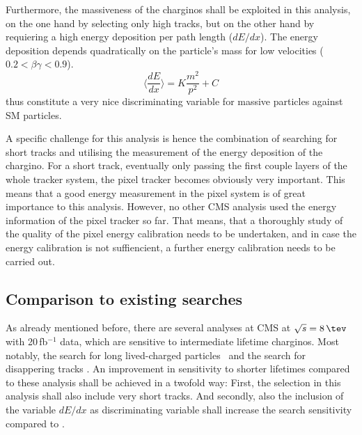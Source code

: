 Furthermore, the massiveness of the charginos shall be exploited in this analysis, on the one hand by selecting only high \pt tracks, but on the other hand by requiering a high energy deposition per path length ($dE/dx$).
The energy deposition depends quadratically on the particle's mass for low velocities ($0.2<\beta\gamma<0.9$).
\begin{equation*}
\langle\frac{dE}{dx}\rangle = K \frac{m^2}{p^2} +C
\end{equation*}
thus constitute a very nice discriminating variable for massive particles against SM particles.
 
A specific challenge for this analysis is hence the combination of searching for short tracks and utilising the measurement of the energy deposition of the chargino.
For a short track, eventually only passing the first couple layers of the whole tracker system, the pixel tracker becomes obviously very important.
This means that a good energy measurement in the pixel system is of great importance to this analysis.
However, no other CMS analysis used the energy information of the pixel tracker so far.
That means, that a thoroughly study of the quality of the pixel energy calibration needs to be undertaken, and in case the energy calibration is not suffiencient, a further energy calibration needs to be carried out.


\subsection{Comparison to existing searches}
As already mentioned before, there are several analyses at CMS at $\sqrt{s}=8\,\tev$ with 20\,fb$^{-1}$ data, which are sensitive to intermediate lifetime charginos. 
Most notably, the search for long lived-charged \mbox{particles \cite{bib:CMS:HSCP_8TeV}} and the search for disappering tracks \cite{bib:CMS:DT_8TeV}.
An improvement in sensitivity to shorter lifetimes compared to these analysis shall be achieved in a twofold way:
First, the selection in this analysis shall also include very short tracks.
And secondly, also the inclusion of the variable $dE/dx$ as discriminating variable shall increase the search sensitivity compared to \cite{bib:CMS:DT_8TeV}.

